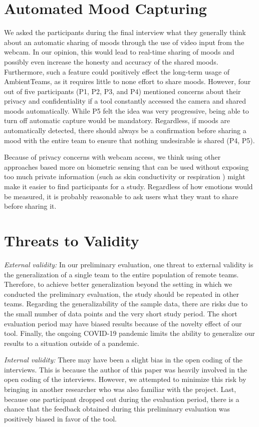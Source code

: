 \section{Automated Mood Capturing}
We asked the participants during the final interview what they generally think about an automatic sharing of moods through the use of video input from the webcam. In our opinion, this would lead to real-time sharing of moods and possibly even increase the honesty and accuracy of the shared moods. Furthermore, such a feature could positively effect the long-term usage of AmbientTeams, as it requires little to none effort to share moods. However, four out of five participants (P1, P2, P3, and P4) mentioned concerns about their privacy and confidentiality if a tool constantly accessed the camera and shared moods automatically. While P5 felt the idea was very progressive, being able to turn off automatic capture would be mandatory. Regardless, if moods are automatically detected, there should always be a confirmation before sharing a mood with the entire team to ensure that nothing undesirable is shared (P4, P5).

Because of privacy concerns with webcam access, we think using other approaches based more on biometric sensing that can be used without exposing too much private information (such as skin conductivity or respiration \autocite{picard2001toward}) might make it easier to find participants for a study. Regardless of how emotions would be measured, it is probably reasonable to ask users what they want to share before sharing it.

\section{Threats to Validity}
\textit{External validity:} In our preliminary evaluation, one threat to external validity is the generalization of a single team to the entire population of remote teams. Therefore, to achieve better generalization beyond the setting in which we conducted the preliminary evaluation, the study should be repeated in other teams. Regarding the generalizability of the sample data, there are risks due to the small number of data points and the very short study period. The short evaluation period may have biased results because of the novelty effect of our tool. Finally, the ongoing COVID-19 pandemic limits the ability to generalize our results to a situation outside of a pandemic.

\medskip\noindent\textit{Internal validity:} There may have been a slight bias in the open coding of the interviews. This is because the author of this paper was heavily involved in the open coding of the interviews. However, we attempted to minimize this risk by bringing in another researcher who was also familiar with the project. Last, because one participant dropped out during the evaluation period, there is a chance that the feedback obtained during this preliminary evaluation was positively biased in favor of the tool. 